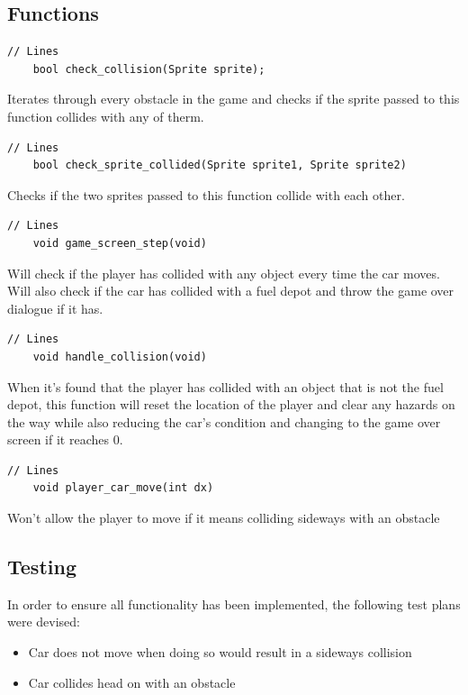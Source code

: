 \documentclass{article}
\begin{document}
\subsection*{Functions}
\begin{lstlisting}[style=CStyle]
	// Lines 
	bool check_collision(Sprite sprite);
\end{lstlisting}
Iterates through every obstacle in the game and checks if the sprite passed to this function collides with any of therm.
\begin{lstlisting}[style=CStyle]
	// Lines 
	bool check_sprite_collided(Sprite sprite1, Sprite sprite2)
\end{lstlisting}
Checks if the two sprites passed to this function collide with each other.
\begin{lstlisting}[style=CStyle]
	// Lines
	void game_screen_step(void)
\end{lstlisting}
Will check if the player has collided with any object every time the car moves. Will also check if the car has collided with a fuel depot and throw the game over dialogue if it has.
\begin{lstlisting}[style=CStyle]
	// Lines
	void handle_collision(void)
\end{lstlisting}
When it's found that the player has collided with an object that is not the fuel depot, this function will reset the location of the player and clear any hazards on the way while also reducing the car's condition and changing to the game over screen if it reaches 0.
\begin{lstlisting}[style=CStyle]
	// Lines 
	void player_car_move(int dx) 
\end{lstlisting}
Won't allow the player to move if it means colliding sideways with an obstacle
\newpage

\subsection*{Testing}
In order to ensure all functionality has been implemented, the following test plans were devised:
\begin{itemize}
	\item Car does not move when doing so would result in a sideways collision
	\item Car collides head on with an obstacle
\end{itemize}
\end{document}
